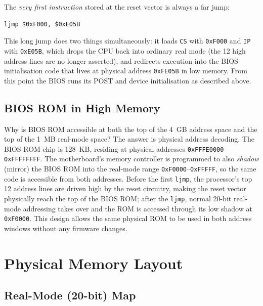 \documentclass[11pt]{article}
\begin{document}
The \emph{very first instruction} stored at the reset vector is always a far jump:

\begin{lstlisting}[language={[x86masm]Assembler}, caption={First instruction executed after reset}]
ljmp $0xF000, $0xE05B
\end{lstlisting}

This long jump does two things simultaneously: it loads \texttt{CS} with \texttt{0xF000}
and \texttt{IP} with \texttt{0xE05B}, which drops the CPU back into ordinary real mode
(the 12 high address lines are no longer asserted), and redirects execution into the BIOS
initialisation code that lives at physical address \texttt{0xFE05B} in low memory. From
this point the BIOS runs its POST and device initialisation as described above.

\subsection{BIOS ROM in High Memory}

Why is BIOS ROM accessible at both the top of the 4~GB address space and the top of the
1~MB real-mode space? The answer is physical address decoding. The BIOS ROM chip is
128~KB, residing at physical addresses \texttt{0xFFFE0000}--\texttt{0xFFFFFFFF}. The
motherboard's memory controller is programmed to also \emph{shadow} (mirror) the BIOS ROM
into the real-mode range \texttt{0xF0000}--\texttt{0xFFFFF}, so the same code is accessible
from both addresses. Before the first \texttt{ljmp}, the processor's top 12 address lines
are driven high by the reset circuitry, making the reset vector physically reach the top
of the BIOS ROM; after the \texttt{ljmp}, normal 20-bit real-mode addressing takes over and
the ROM is accessed through its low shadow at \texttt{0xF0000}. This design allows the same
physical ROM to be used in both address windows without any firmware changes.

\section{Physical Memory Layout}

\subsection{Real-Mode (20-bit) Map}
\end{document}
